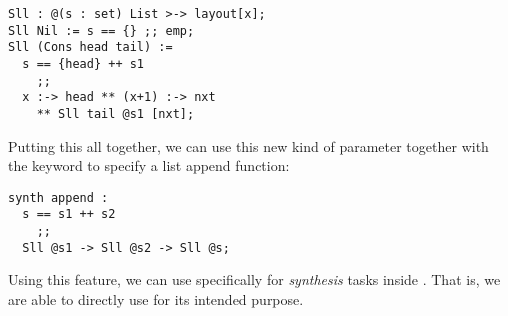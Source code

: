 \begin{lstlisting}[language=Pika]
Sll : @(s : set) List >-> layout[x];
Sll Nil := s == {} ;; emp;
Sll (Cons head tail) :=
  s == {head} ++ s1
    ;;
  x :-> head ** (x+1) :-> nxt
    ** Sll tail @s1 [nxt];
\end{lstlisting}

\noindent
Putting this all together, we can use this new kind of parameter together with the \synth{} keyword to specify a list append function:

\begin{lstlisting}[language=Pika]
synth append :
  s == s1 ++ s2
    ;;
  Sll @s1 -> Sll @s2 -> Sll @s;
\end{lstlisting}

\noindent
Using this feature, we can use \SuSLik{} specifically for \textit{synthesis} tasks inside \Pika. That is, we are able to directly use \SuSLik{} for its intended purpose.


